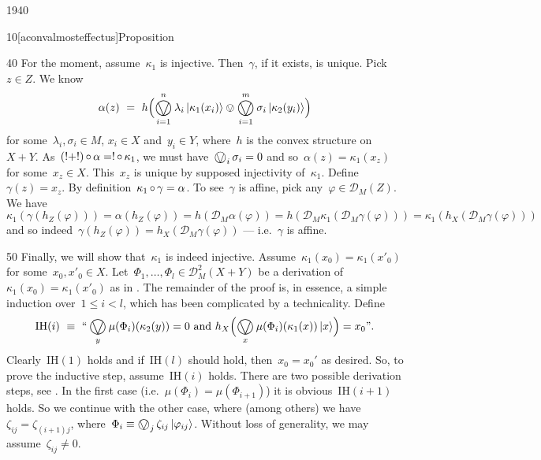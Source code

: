 \begin{parsec}{1940}
\begin{point}{10}[aconvalmosteffectus]{Proposition}
\begin{point}{40}
For the moment, assume~$\kappa_1$ is injective.
Then~$\gamma$, if it exists, is unique.
Pick~$z \in Z$.
We know
\begin{equation*}
    \alpha(z) \ =\  h 
    \Bigl( \bigovee^n_{i=1} \lambda_i \ket{\kappa_1(x_i)}
    \ovee \bigovee^m_{i=1} \sigma_i \ket{\kappa_2(y_i)} \Bigr)
\end{equation*}
for some~$\lambda_i,\sigma_i \in M $, 
$x_i \in X$ and~$y_i \in Y$,
where~$h$ is the convex structure on~$X+Y$.
As~$(!+!) \mathop{\circ} \alpha = ! \mathop{\circ} \kappa_1$,
    we must have~$\bigovee_i \sigma_i = 0$
    and so~$\alpha(z) = \kappa_1(x_z)$
    for some~$x_z \in X$.
This~$x_z$ is unique by supposed injectivity of~$\kappa_1$.
    Define~$\gamma(z) = x_z$.
By definition~$\kappa_1 \mathop{\circ} \gamma = \alpha$.
To see~$\gamma$ is affine, pick any~$\varphi \in \mathcal{D}_M (Z)$.
We have
$
\kappa_1 ( \gamma ( h_Z (\varphi )))
    = \alpha(h_Z (\varphi))
    = h(\mathcal{D}_M\alpha(\varphi))
    = h(\mathcal{D}_M\kappa_1 ( \mathcal{D}_M \gamma(\varphi)))
    = \kappa_1  (h_X( \mathcal{D}_M \gamma(\varphi)))
$ and
so indeed~$\gamma(h_Z(\varphi)) = h_X(\mathcal{D}_M \gamma (\varphi))$
    --- i.e.~$\gamma$ is affine.
\end{point}
\begin{point}{50}%
Finally, we will show that~$\kappa_1$ is indeed injective.
Assume~$\kappa_1(x_0) = \kappa_1(x'_0)$
for some~$x_0,x'_0 \in X$.
    Let~$\Phi_1, \ldots, \Phi_l \in \mathcal{D}_M^2{(X+Y)}$
    be a derivation
    of~$\kappa_1(x_0) = \kappa_1(x'_0)$
    as in .
The remainder of the proof is, in essence, a simple induction
    over~$1 \leq i < l$, which has been complicated
    by a technicality.
Define
\begin{equation*}
    \mathrm{IH}(i) \ \equiv \ \text{``}
    \bigovee_y \mu(\Phi_i)(\kappa_2 (y)) = 0
        \text{ and }
        h_X\Bigl(\bigovee_{x} \mu(\Phi_i)(\kappa_1(x)) \ket{x}\Bigr)
        =    x_0 \text{''}.
\end{equation*}
Clearly~$\mathrm{IH}(1)$ holds
    and if~$\mathrm{IH}(l)$ should hold,
    then~$x_0 = x_0'$ as desired.
So, to prove the inductive step, assume~$\mathrm{IH}(i)$ holds.
There are two possible derivation steps, see .
In the first case (i.e.~$\mu(\Phi_i) = \mu(\Phi_{i+1})$)
    it is obvious~$\mathrm{IH}(i+1)$ holds.
So we continue with the other case,
where (among others) we have~$\zeta_{ij} = \zeta_{(i+1)j}$,
    where~$\Phi_i \equiv \bigovee_j \zeta_{ij} \ket{\varphi_{ij}}$.
Without loss of generality, we may assume~$\zeta_{ij} \neq 0$.

\end{point}
\end{point}
\end{parsec}
